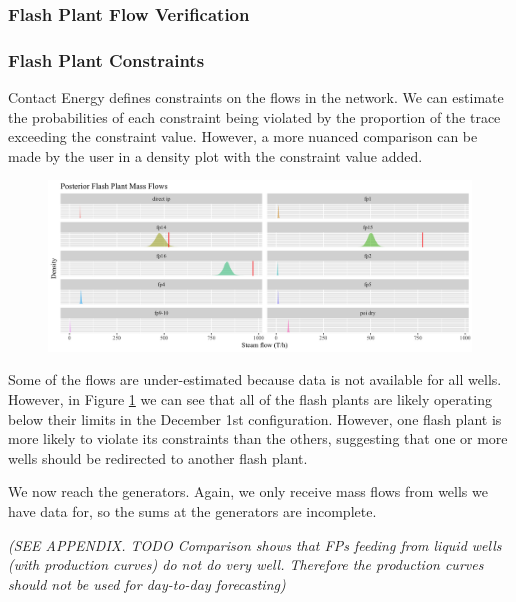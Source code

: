 \documentclass[a4paper, 12pt]{article}
\begin{document}
\subsubsection{Flash Plant Flow Verification}

\subsubsection{Flash Plant Constraints}
Contact Energy defines constraints on the flows in the network. We can estimate the probabilities of each constraint being violated by the proportion of the trace exceeding the constraint value. However, a more nuanced comparison can be made by the user in a density plot with the constraint value added.

\begin{figure}
\centering
  \includegraphics[width=\linewidth]{media/constraints}
  \label{fig:constraints}
\end{figure}

Some of the flows are under-estimated because data is not available for all wells. However, in Figure \ref{fig:constraints} we can see that all of the flash plants are likely operating below their limits in the December 1st configuration. However, one flash plant is more likely to violate its constraints than the others, suggesting that one or more wells should be redirected to another flash plant.

We now reach the generators. Again, we only receive mass flows from wells we have data for, so the sums at the generators are incomplete.

\emph{(SEE APPENDIX. TODO Comparison shows that FPs feeding from liquid wells (with production curves) do not do very well. Therefore the production curves should not be used for day-to-day forecasting)}
\end{document}
